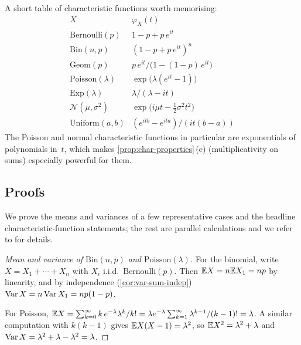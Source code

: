 \begin{remark}
A short table of characteristic functions worth memorising:
\[
  \begin{array}{l|l}
    X & \varphi_X(t) \\ \hline
    \mathrm{Bernoulli}(p)        & 1 - p + p\, e^{it} \\
    \mathrm{Bin}(n, p)           & (1 - p + p\, e^{it})^n \\
    \mathrm{Geom}(p)             & p\, e^{it} / \bigl(1 - (1 - p)\, e^{it}\bigr) \\
    \mathrm{Poisson}(\lambda)    & \exp\!\bigl(\lambda(e^{it} - 1)\bigr) \\
    \mathrm{Exp}(\lambda)        & \lambda / (\lambda - it) \\
    \mathcal{N}(\mu, \sigma^2)   & \exp\!\bigl(i \mu t - \tfrac{1}{2} \sigma^2 t^2\bigr) \\
    \mathrm{Uniform}(a, b)       & (e^{itb} - e^{ita}) / (it(b - a))
  \end{array}
\]
The Poisson and normal characteristic functions in particular are
exponentials of polynomials in~$t$, which makes
\cref{prop:char-properties}\,(e) (multiplicativity on sums)
especially powerful for them.
\end{remark}

\subsection*{Proofs}

We prove the means and variances of a few representative cases and
the headline characteristic-function statements; the rest are
parallel calculations and we refer to \cite[Ch.~II,
\S~3-4]{Shiryaev1989} for details.

\begin{proof}[Mean and variance of $\mathrm{Bin}(n, p)$ and $\mathrm{Poisson}(\lambda)$]
For the binomial, write $X = X_1 + \cdots + X_n$ with $X_i$ i.i.d.\
$\mathrm{Bernoulli}(p)$. Then $\mathbb{E} X = n \mathbb{E} X_1 = np$ by linearity,
and by independence (\cref{cor:var-sum-indep})
$\operatorname{Var} X = n \operatorname{Var} X_1 = n p (1 - p)$.

For Poisson, $\mathbb{E} X = \sum_{k = 0}^{\infty} k\, e^{-\lambda} \lambda^k / k! = \lambda e^{-\lambda} \sum_{k = 1}^{\infty} \lambda^{k-1}/(k-1)! = \lambda$.
A similar computation with $k(k - 1)$ gives
$\mathbb{E} X(X-1) = \lambda^2$, so $\mathbb{E} X^2 = \lambda^2 + \lambda$ and
$\operatorname{Var} X = \lambda^2 + \lambda - \lambda^2 = \lambda$.
\end{proof}

